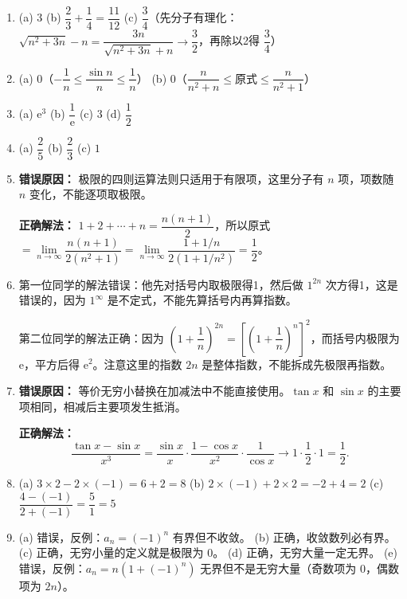 \documentclass[fontset=fandol]{ctexart}
\newcommand{\ee}{\mathrm{e}}
\begin{document}
\begin{enumerate}
\item[1.] 
   (a) \(3\) \quad (b) \(\dfrac{2}{3} + \dfrac{1}{4} = \dfrac{11}{12}\) \quad (c) \(\dfrac{3}{4}\)（先分子有理化：\(\sqrt{n^2+3n} - n = \dfrac{3n}{\sqrt{n^2+3n}+n} \to \dfrac{3}{2}\)，再除以2得 \(\dfrac{3}{4}\)）

\item[2.] 
   (a) \(0\)（\(-\dfrac{1}{n} \leq \dfrac{\sin n}{n} \leq \dfrac{1}{n}\)）\quad 
   (b) \(0\)（\(\dfrac{n}{n^2+n} \leq \text{原式} \leq \dfrac{n}{n^2+1}\)）

\item[3.] 
(a) \(\ee^3\) \quad (b) \(\dfrac{1}{\ee}\) \quad (c) \(3\) \quad (d) \(\dfrac{1}{2}\)

\item[4.] 
   (a) \(\dfrac{2}{5}\) \quad (b) \(\dfrac{2}{3}\) \quad (c) \(1\)

\item[5.] 
   \textbf{错误原因：} 极限的四则运算法则只适用于有限项，这里分子有 \(n\) 项，项数随 \(n\) 变化，不能逐项取极限。
   
   \textbf{正确解法：} \(1+2+\cdots+n = \dfrac{n(n+1)}{2}\)，所以原式 \(= \lim\limits_{n\to\infty} \dfrac{n(n+1)}{2(n^2+1)} = \lim\limits_{n\to\infty} \dfrac{1+1/n}{2(1+1/n^2)} = \dfrac{1}{2}\)。

\item[6.] 
   第一位同学的解法错误：他先对括号内取极限得1，然后做 \(1^{2n}\) 次方得1，这是错误的，因为 \(1^\infty\) 是不定式，不能先算括号内再算指数。
   
第二位同学的解法正确：因为 \(\left(1+\dfrac{1}{n}\right)^{2n} = \left[\left(1+\dfrac{1}{n}\right)^n\right]^2\)，而括号内极限为 \(\ee\)，平方后得 \(\ee^2\)。注意这里的指数 \(2n\) 是整体指数，不能拆成先极限再指数。

\item[7.] 
   \textbf{错误原因：} 等价无穷小替换在加减法中不能直接使用。\(\tan x\) 和 \(\sin x\) 的主要项相同，相减后主要项发生抵消。
   
   \textbf{正确解法：}
   \[
   \frac{\tan x-\sin x}{x^3}
   =\frac{\sin x}{x}\cdot\frac{1-\cos x}{x^2}\cdot\frac1{\cos x}
   \longrightarrow 1\cdot\frac12\cdot1=\frac12.
   \]

\item[8.] 
   (a) \(3 \times 2 - 2 \times (-1) = 6 + 2 = 8\) \quad
   (b) \(2 \times (-1) + 2 \times 2 = -2 + 4 = 2\) \quad
   (c) \(\dfrac{4 - (-1)}{2 + (-1)} = \dfrac{5}{1} = 5\)

\item[9.] 
   (a) 错误，反例：\(a_n = (-1)^n\) 有界但不收敛。\quad
   (b) 正确，收敛数列必有界。\quad
   (c) 正确，无穷小量的定义就是极限为 0。\quad
   (d) 正确，无穷大量一定无界。\quad
   (e) 错误，反例：\(a_n = n(1+(-1)^n)\) 无界但不是无穷大量（奇数项为 0，偶数项为 \(2n\)）。


\end{enumerate}
\end{document}
